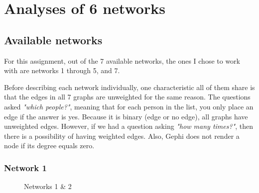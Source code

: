 \section{Analyses of 6 networks}
\subsection{Available networks}
For this assignment, out of the 7 available networks, the ones I chose to work with are networks 1 through 5, and 7.

Before describing each network individually, one characteristic all of them share is that the edges in all 7 graphs are unweighted for the same reason. The questions asked \textit{"which people?"}, meaning that for each person in the list, you only place an edge if the answer is yes. Because it is binary (edge or no edge), all graphs have unweighted edges. However, if we had a question asking \textit{"how many times?"}, then there is a possibility of having weighted edges. Also, Gephi does not render a node if its degree equals zero.

\subsubsection{Network 1}
\begin{figure}
    \centering
    \qquad
    \caption{Networks 1 \& 2}
    \label{fig:1}
\end{figure}


